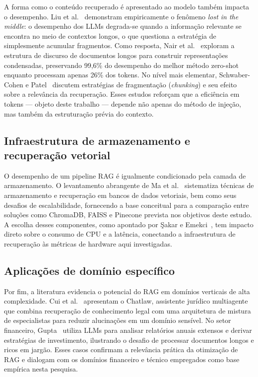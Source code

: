 A forma como o conteúdo recuperado é apresentado ao modelo também impacta o desempenho. Liu et al.~\cite{liu2023lost} demonstram empiricamente o fenômeno \textit{lost in the middle}: o desempenho dos LLMs degrada-se quando a informação relevante se encontra no meio de contextos longos, o que questiona a estratégia de simplesmente acumular fragmentos. Como resposta, Nair et al.~\cite{nair2023drilling} exploram a estrutura de discurso de documentos longos para construir representações condensadas, preservando 99,6\% do desempenho do melhor método zero-shot enquanto processam apenas 26\% dos tokens. No nível mais elementar, Schwaber-Cohen e Patel~\cite{schwaber2025chunking} discutem estratégias de fragmentação (\textit{chunking}) e seu efeito sobre a relevância da recuperação. Esses estudos reforçam que a eficiência em tokens --- objeto deste trabalho --- depende não apenas do método de injeção, mas também da estruturação prévia do contexto.

\subsection{Infraestrutura de armazenamento e recuperação vetorial}

O desempenho de um pipeline RAG é igualmente condicionado pela camada de armazenamento. O levantamento abrangente de Ma et al.~\cite{ma2024vectorsurvey} sistematiza técnicas de armazenamento e recuperação em bancos de dados vetoriais, bem como seus desafios de escalabilidade, fornecendo a base conceitual para a comparação entre soluções como ChromaDB, FAISS e Pinecone prevista nos objetivos deste estudo. A escolha desses componentes, como apontado por Şakar e Emekci~\cite{sakar2025rag}, tem impacto direto sobre o consumo de CPU e a latência, conectando a infraestrutura de recuperação às métricas de hardware aqui investigadas.

\subsection{Aplicações de domínio específico}

Por fim, a literatura evidencia o potencial do RAG em domínios verticais de alta complexidade. Cui et al.~\cite{cui2023chatlaw} apresentam o Chatlaw, assistente jurídico multiagente que combina recuperação de conhecimento legal com uma arquitetura de mistura de especialistas para reduzir alucinações em um domínio sensível. No setor financeiro, Gupta~\cite{gupta2023gptinvestar} utiliza LLMs para analisar relatórios anuais extensos e derivar estratégias de investimento, ilustrando o desafio de processar documentos longos e ricos em jargão. Esses casos confirmam a relevância prática da otimização de RAG e dialogam com os domínios financeiro e técnico empregados como base empírica nesta pesquisa.


